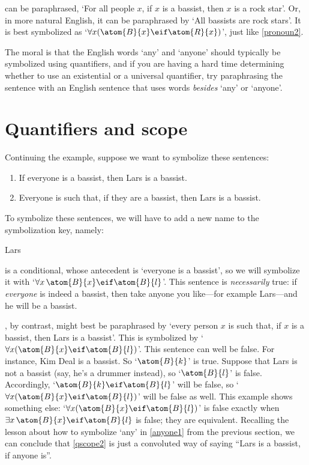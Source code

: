  can be paraphrased, `For all people $x$, if $x$ is a bassist, then $x$ is a rock star'. Or, in more natural English, it can be paraphrased by `All bassists are rock stars'. It is best symbolized as `$\forall x(\atom{B}{x} \eif \atom{R}{x})$', just like \cref*{pronoun2}.

The moral is that the English words `any' and `anyone' should typically be symbolized using quantifiers, and if you are having a hard time determining whether to use an existential or a universal quantifier, try paraphrasing the sentence with an English sentence that uses words \emph{besides} `any' or `anyone'.



\section{Quantifiers and scope}
Continuing the example, suppose we want to symbolize these sentences:
	\begin{enumerate}
		\item\label{qscope1} If everyone is a bassist, then Lars is a bassist.
		\item\label{qscope2} Everyone is such that, if they are a bassist, then Lars is a bassist.
	\end{enumerate}
To symbolize these sentences, we will have to add a new name to the symbolization key, namely:
	\begin{ekey}
		\item[l] Lars
	\end{ekey}
 is a conditional, whose antecedent is `everyone is a bassist', so we will symbolize it with `$\forall x\, \atom{B}{x} \eif \atom{B}{l}$'. This sentence is \emph{necessarily} true: if \emph{everyone} is indeed a bassist, then take anyone you like---for example Lars---and he will be a bassist.

, by contrast, might best be paraphrased by `every
person $x$ is such that, if $x$ is a bassist, then Lars is a bassist'.
This is symbolized by `$\forall x (\atom{B}{x} \eif \atom{B}{l})$'.
This sentence can well be false. For instance, Kim Deal is a bassist.
So `$\atom{B}{k}$' is true. Suppose that Lars is not a bassist (say,
he's a drummer instead), so `$\atom{B}{l}$' is false. Accordingly,
`$\atom{B}{k} \eif \atom{B}{l}$' will be false, so `$\forall x
(\atom{B}{x} \eif \atom{B}{l})$' will be false as well. This example
shows something else: `$\forall x (\atom{B}{x} \eif \atom{B}{l})$' is
false exactly when $\exists x\,\atom{B}{x} \eif \atom{B}{l}$ is false;
they are equivalent. Recalling the lesson about how to symbolize `any'
in \cref{anyone1} from the previous section, we can conclude that
\cref*{qscope2} is just a convoluted way of saying ``Lars is a bassist,
if anyone is''.

